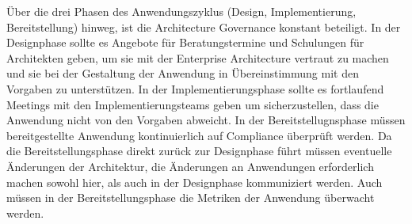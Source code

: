 Über die drei Phasen des Anwendungszyklus (Design, Implementierung, Bereitstellung) hinweg, ist die Architecture Governance konstant beteiligt. In der Designphase sollte es Angebote für Beratungstermine und Schulungen für Architekten geben, um sie mit der Enterprise Architecture vertraut zu machen und sie bei der Gestaltung der Anwendung in Übereinstimmung mit den Vorgaben zu unterstützen. In der Implementierungsphase sollte es fortlaufend Meetings mit den Implementierungsteams geben um sicherzustellen, dass die Anwendung nicht von den Vorgaben abweicht. In der Bereitstellugnsphase müssen bereitgestellte Anwendung kontinuierlich auf Compliance überprüft werden. Da die Bereitstellungsphase direkt zurück zur Designphase führt müssen eventuelle Änderungen der Architektur, die Änderungen an Anwendungen erforderlich machen sowohl hier, als auch in der Designphase kommuniziert werden. Auch müssen in der Bereitstellungsphase die Metriken der Anwendung überwacht werden.